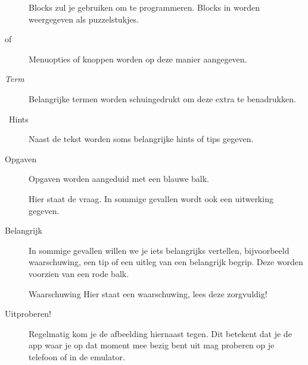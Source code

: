 \begin{description}
   \item[] Blocks zul je gebruiken om te programmeren. Blocks in \ai worden weergegeven als puzzelstukjes. 
   \item[ of ] Menuopties of knoppen worden op deze manier aangegeven.
   \item[\emph{Term}] Belangrijke termen worden schuingedrukt om deze extra te benadrukken.
   \item[\lefthand\ Hints] Naast de tekst worden soms belangrijke hints of tips gegeven.
   \item[Opgaven] Opgaven worden aangeduid met een blauwe balk. 
     \begin{opgave}
       \opgVraag
	Hier staat de vraag.
       \opgUitwerking
         In sommige gevallen wordt ook een uitwerking gegeven.
     \end{opgave}
   \item[Belangrijk] In sommige gevallen willen we je iets belangrijks vertellen, bijvoorbeeld waarschuwing, een tip of een uitleg van een belangrijk begrip. Deze worden voorzien van een rode balk.
     \begin{derivation}{Waarschuwing}
       Hier staat een waarschuwing, lees deze zorgvuldig!
      \end{derivation}
    \item[Uitproberen!] \runOpTelefoon{} Regelmatig kom je de afbeelding hiernaast tegen. Dit betekent dat je de app waar je op dat moment mee bezig bent uit mag proberen op je telefoon of in de emulator.
\end{description}
